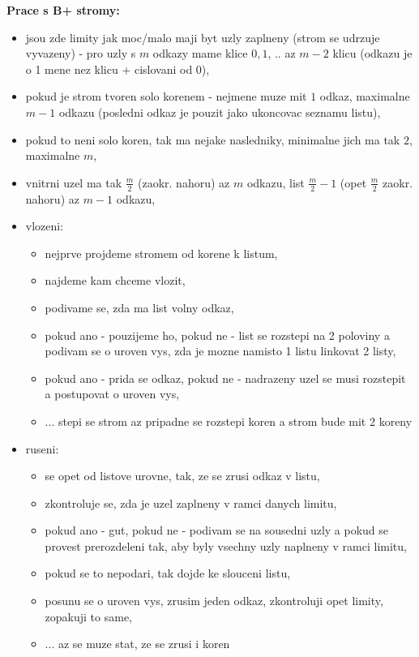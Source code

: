 \documentclass[a4paper, 11pt]{article}
\begin{document}
\textbf{Prace s B+ stromy:}
\begin{itemize}
    \item jsou zde limity jak moc/malo maji byt uzly zaplneny (strom se udrzuje vyvazeny) - pro uzly s $m$ odkazy mame klice $0, 1$, .. az $m - 2$ klicu (odkazu je o 1 mene nez klicu + cislovani od 0), 
    \item pokud je strom tvoren solo korenem - nejmene muze mit $1$ odkaz, maximalne $m - 1$ odkazu (posledni odkaz je pouzit jako ukoncovac seznamu listu),
    \item pokud to neni solo koren, tak ma nejake nasledniky, minimalne jich ma tak $2$, maximalne $m$,
    \item vnitrni uzel ma tak $\frac{m}{2}$ (zaokr. nahoru) az $m$ odkazu, list $\frac{m}{2} - 1$ (opet $\frac{m}{2}$ zaokr. nahoru) az $m - 1$ odkazu,
    \item vlozeni:
    \begin{itemize}
        \item nejprve projdeme stromem od korene k listum,
        \item najdeme kam chceme vlozit,
        \item podivame se, zda ma list volny odkaz,
        \item pokud ano - pouzijeme ho, pokud ne - list se rozstepi na 2 poloviny a podivam se o uroven vys, zda je mozne namisto 1 listu linkovat 2 listy,
        \item pokud ano - prida se odkaz, pokud ne - nadrazeny uzel se musi rozstepit a postupovat o uroven vys,
        \item ... stepi se strom az pripadne se rozstepi koren a strom bude mit 2 koreny
    \end{itemize}
    \item ruseni:
    \begin{itemize}
        \item se opet od listove urovne, tak, ze se zrusi odkaz v listu,
        \item zkontroluje se, zda je uzel zaplneny v ramci danych limitu,
        \item pokud ano - gut, pokud ne - podivam se na sousedni uzly a pokud se provest prerozdeleni tak, aby byly vsechny uzly naplneny v ramci limitu,
        \item pokud se to nepodari, tak dojde ke slouceni listu,
        \item posunu se o uroven vys, zrusim jeden odkaz, zkontroluji opet limity, zopakuji to same,
        \item ... az se muze stat, ze se zrusi i koren \\
    \end{itemize}
\end{itemize}
\end{document}
